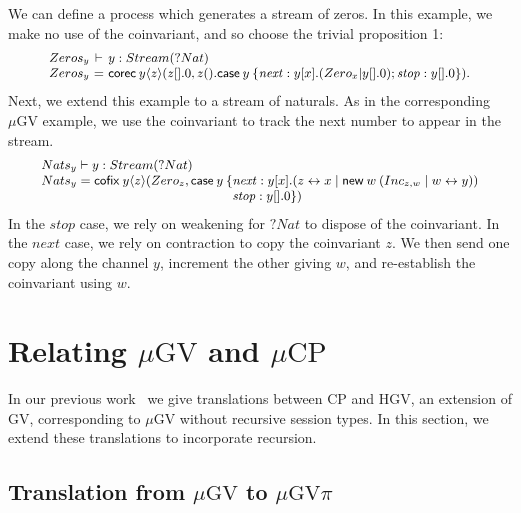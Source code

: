 \documentclass[orivec,envcountsame]{llncs}
\makeatletter
\newcommand{\cpquery}[1]{{? #1}}
\newcommand{\mkwd}[1]{\mathsf{#1}}
\newcommand{\link}[2]{#1 \leftrightarrow #2}
\newcommand{\cut}[4]{\mkwd{new}\:#1 \: (#3 \mid #4)}
\newcommand{\corec}[5]{\mkwd{corec}\:#1 \langle #2 \rangle (#4,#5)}
\newcommand{\clabel}[1]{\mathit{#1}}
\renewcommand{\case}[2]{\mkwd{case}\:#1\:\{#2\}}
\newcommand{\lrkwd}{\mkwd{cofix}}
\newcommand{\key}{\mkwd}
\newcommand{\mucp}{$\mu\mathrm{CP}$\xspace}
\newcommand{\mugv}{$\mu\mathrm{GV}$\xspace}
\newcommand{\gvpi}{$\mu\mathrm{GV}\pi$\xspace}
\newcommand{\ba}{\begin{array}}
\newcommand{\ea}{\end{array}}
\newcommand{\bl}{\ba[t]{@{}l@{}}}
\newcommand{\el}{\ea}
\newenvironment{eqs}{\ba{@{}r@{~}c@{~}l@{}}}{\ea}
\makeatother
\begin{document}
We can define a process which generates a stream of zeros.  In this example, we make no use of the
coinvariant, and so choose the trivial proposition 1:
\[\small\begin{eqs}
  Zeros_y &\vdash& y:Stream(\cpquery{Nat}) \\
  Zeros_y &=& \corec{y}{z}{1}{z[].0}{z().\case{y}{\clabel{next}: y[x].(Zero_x | y[].0); \clabel{stop}: y[].0}}.
\end{eqs}\]
Next, we extend this example to a stream of naturals.  As in the corresponding \mugv example, we use
the coinvariant to track the next number to appear in the stream.
\[\small
\bl
  Nats_y \vdash y:Stream(\cpquery{Nat}) \\
  Nats_y = \lrkwd \: y \langle z \rangle (Zero_z,
    \key{case}\:y \:\{
       \bl
       \clabel{next}: y[x].(\link{z}{x} \mid \cut{w}{}{Inc_{z,w}}{\link{w}{y}}) \\
       \clabel{stop}: y[].0\}) \\
       \el \\
\el
\]
%
In the $\clabel{stop}$ case, we rely on weakening for $\cpquery{Nat}$ to dispose of the coinvariant.
In the $\clabel{next}$ case, we rely on contraction to copy the coinvariant $z$.  We then send one
copy along the channel $y$, increment the other giving $w$, and re-establish the coinvariant using
$w$.

\section{Relating \mugv and \mucp}\label{sec:translation}

In our previous work~\citep{LindleyM14} we give translations between CP and HGV, an extension of GV,
corresponding to \mugv without recursive session types. In this section, we extend these
translations to incorporate recursion.

\subsection{Translation from \mugv to \gvpi}\label{sec:gvtogvpi}
\end{document}
